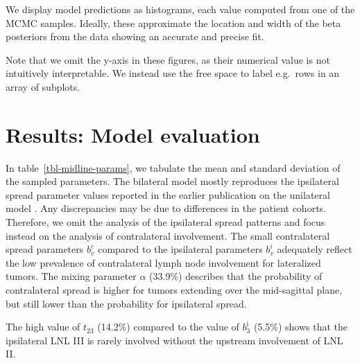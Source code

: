 \documentclass[
  sn-mathphys-num,
]{sn-jnl}
\begin{document}
We display model predictions as histograms, each value computed from one
of the MCMC samples. Ideally, these approximate the location and width
of the beta posteriors from the data showing an accurate and precise
fit.

Note that we omit the y-axis in these figures, as their numerical value
is not intuitively interpretable. We instead use the free space to label
e.g.~rows in an array of subplots.

\section{Results: Model evaluation}\label{sec-results}

In table~\ref{tbl-midline-params}, we tabulate the mean and standard
deviation of the sampled parameters. The bilateral model mostly
reproduces the ipsilateral spread parameter values reported in the
earlier publication on the unilateral model
\citep{ludwig_modelling_2023}. Any discrepancies may be due to
differences in the patient cohorts. Therefore, we omit the analysis of
the ipsilateral spread patterns and focus instead on the analysis of
contralateral involvement. The small contralateral spread parameters
\(b^c_v\) compared to the ipsilateral parameters \(b^i_v\) adequately
reflect the low prevalence of contralateral lymph node involvement for
lateralized tumors. The mixing parameter \(\alpha\) (33.9\%) describes
that the probability of contralateral spread is higher for tumors
extending over the mid-sagittal plane, but still lower than the
probability for ipsilateral spread.

The high value of \(t_{23}\) (14.2\%) compared to the value of
\(b_3^\text{i}\) (5.5\%) shows that the ipsilateral LNL III is rarely
involved without the upstream involvement of LNL II.
\end{document}
